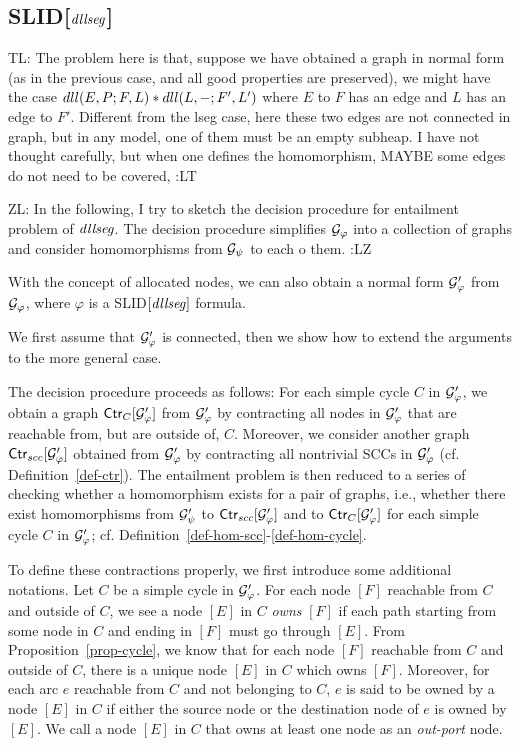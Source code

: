 \documentclass{llncs}
\newcommand{\zhilin}[1]{\color{red} {ZL: #1 :LZ} \color{black}}
\newcommand{\tl}[1]{\color{blue} {TL: #1 :LT} \color{black}}
\begin{document}
\subsection{SLID[$\mathit{dllseg}$]}




\tl{
The problem here is that, suppose we have obtained a graph in normal form (as in the previous case, and all good properties are preserved), we might have the case $dll(E, P; F, L)\ast dll(L, -; F', L')$ where $E$ to $F$ has an edge and $L$ has an edge to $F'$. Different from the lseg case, here these two edges are not connected in graph, but in any model, one of them must be an empty subheap. I have not thought carefully, but when one defines the homomorphism, MAYBE some edges do not need to be covered,
}


\zhilin{In the following, I try to sketch the decision procedure for entailment problem of $\mathit{dllseg}$. The decision procedure simplifies $\mathcal{G}_\varphi$ into a collection of graphs and consider homomorphisms from $\mathcal{G}_\psi$ to each o them.}

With the concept of allocated nodes, we can also obtain a normal form $\mathcal{G}'_\varphi$ from $\mathcal{G}_\varphi$, where $\varphi$ is a SLID$[\mathit{dllseg}]$ formula.


We first assume that $\mathcal{G}'_\varphi$ is connected, then we show how to extend the arguments to the more general case.

The decision procedure proceeds as follows: For each simple cycle $C$ in $\mathcal{G}'_\varphi$, we obtain a graph ${\sf Ctr}_C[\mathcal{G}'_\varphi]$ from $\mathcal{G}'_\varphi$ by contracting all  nodes in $\mathcal{G}'_\varphi$ that are reachable from, but are outside of, $C$. Moreover, we consider another graph ${\sf Ctr}_{scc}[\mathcal{G}'_\varphi]$ obtained from $\mathcal{G}'_\varphi$ by contracting all  nontrivial SCCs in $\mathcal{G}'_\varphi$ (cf. Definition~\ref{def-ctr}). The entailment problem is then reduced to a series of checking whether a homomorphism exists for a pair of graphs, i.e.,  %
whether there exist homomorphisms from $ \mathcal{G}'_\psi$ to ${\sf Ctr}_{scc}[\mathcal{G}'_\varphi]$ and %
to ${\sf Ctr}_C[\mathcal{G}'_\varphi]$ for each simple cycle $C$ in $\mathcal{G}'_\varphi$; cf. Definition~\ref{def-hom-scc}-\ref{def-hom-cycle}.

To define these contractions properly, we first introduce some additional notations.
Let $C$ be a simple cycle in $\mathcal{G}'_\varphi$. For each node $[F]$ reachable from $C$ and outside of $C$, we see a node $[E]$ in $C$ \emph{owns} $[F]$ if each path starting from some node in $C$ and ending in $[F]$ must go through $[E]$. From Proposition~\ref{prop-cycle}, we know that for each node $[F]$ reachable from $C$ and outside of $C$, there is a unique node $[E]$ in $C$ which owns $[F]$. Moreover, for each arc $e$ reachable from $C$ and not belonging to $C$, $e$ is said to be owned by a node $[E]$ in $C$ if either the source node or the destination node of $e$ is owned by $[E]$. We call a node $[E]$ in $C$ that owns at least one node as an \emph{out-port} node.
\end{document}
